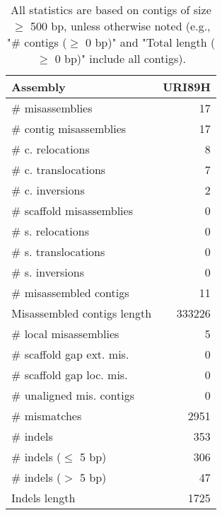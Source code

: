 \documentclass[12pt,a4paper]{article}
\begin{document}
\begin{table}[ht]
\begin{center}
\caption{All statistics are based on contigs of size $\geq$ 500 bp, unless otherwise noted (e.g., "\# contigs ($\geq$ 0 bp)" and "Total length ($\geq$ 0 bp)" include all contigs).}
\begin{tabular}{|l*{1}{|r}|}
\hline
Assembly & URI89H \\ \hline
\# misassemblies & 17 \\ \hline
\hspace{2mm}\# contig misassemblies & 17 \\ \hline
\hspace{5mm}\# c. relocations & 8 \\ \hline
\hspace{5mm}\# c. translocations & 7 \\ \hline
\hspace{5mm}\# c. inversions & 2 \\ \hline
\hspace{2mm}\# scaffold misassemblies & 0 \\ \hline
\hspace{5mm}\# s. relocations & 0 \\ \hline
\hspace{5mm}\# s. translocations & 0 \\ \hline
\hspace{5mm}\# s. inversions & 0 \\ \hline
\# misassembled contigs & 11 \\ \hline
Misassembled contigs length & 333226 \\ \hline
\# local misassemblies & 5 \\ \hline
\# scaffold gap ext. mis. & 0 \\ \hline
\# scaffold gap loc. mis. & 0 \\ \hline
\# unaligned mis. contigs & 0 \\ \hline
\# mismatches & 2951 \\ \hline
\# indels & 353 \\ \hline
\hspace{5mm}\# indels ($\leq$ 5 bp) & 306 \\ \hline
\hspace{5mm}\# indels ($>$ 5 bp) & 47 \\ \hline
Indels length & 1725 \\ \hline
\end{tabular}
\end{center}
\end{table}
\end{document}

